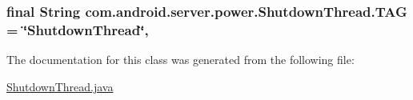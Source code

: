 \hypertarget{classcom_1_1android_1_1server_1_1power_1_1ShutdownThread_a1ab8709099d9b2c4801f53c83fec1b62}{
\subsubsection[{T\-A\-G}]{\setlength{\rightskip}{0pt plus 5cm}final String com.\-android.\-server.\-power.\-Shutdown\-Thread.\-T\-A\-G = \char`\"{}Shutdown\-Thread\char`\"{}\hspace{0.3cm}{\ttfamily [static]}, {\ttfamily [private]}}}\label{classcom_1_1android_1_1server_1_1power_1_1ShutdownThread_a1ab8709099d9b2c4801f53c83fec1b62}


The documentation for this class was generated from the following file\-:\begin{DoxyCompactItemize}
\item 
\hyperlink{ShutdownThread_8java}{Shutdown\-Thread.\-java}\end{DoxyCompactItemize}
